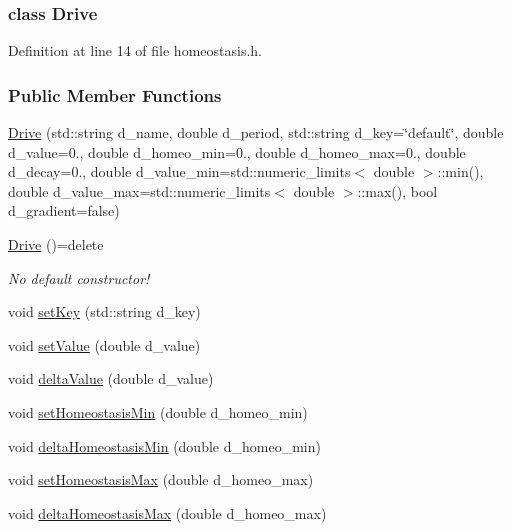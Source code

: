 \subsubsection{class Drive}


Definition at line 14 of file homeostasis.\+h.

\subsubsection*{Public Member Functions}
\begin{DoxyCompactItemize}
\item 
\hyperlink{group__homeostasis_ab98d3c78f3e55b972f730e42dd46de31}{Drive} (std\+::string d\+\_\+name, double d\+\_\+period, std\+::string d\+\_\+key=\char`\"{}default\char`\"{}, double d\+\_\+value=0., double d\+\_\+homeo\+\_\+min=0., double d\+\_\+homeo\+\_\+max=0., double d\+\_\+decay=0., double d\+\_\+value\+\_\+min=std\+::numeric\+\_\+limits$<$ double $>$\+::min(), double d\+\_\+value\+\_\+max=std\+::numeric\+\_\+limits$<$ double $>$\+::max(), bool d\+\_\+gradient=false)
\item 
\hyperlink{group__homeostasis_a289d5dd9c0008856918199c15c520b55}{Drive} ()=delete
\begin{DoxyCompactList}\small\item\em No default constructor! \end{DoxyCompactList}\item 
void \hyperlink{group__homeostasis_aa66a1525b86bf51c0d8d30172766a98b}{set\+Key} (std\+::string d\+\_\+key)
\item 
void \hyperlink{group__homeostasis_a6c5b108ec53e5378f61a0af7ae207dfc}{set\+Value} (double d\+\_\+value)
\item 
void \hyperlink{group__homeostasis_a2f4190860384dcba745f87af3951dd60}{delta\+Value} (double d\+\_\+value)
\item 
void \hyperlink{group__homeostasis_acc9e502d6f8b11e9d66355fb16effdbd}{set\+Homeostasis\+Min} (double d\+\_\+homeo\+\_\+min)
\item 
void \hyperlink{group__homeostasis_a8e2c37a5788ce4ad36c7158dc4a38d12}{delta\+Homeostasis\+Min} (double d\+\_\+homeo\+\_\+min)
\item 
void \hyperlink{group__homeostasis_a54a7b939ea363a8c1bd4433929921f28}{set\+Homeostasis\+Max} (double d\+\_\+homeo\+\_\+max)
\item 
void \hyperlink{group__homeostasis_a56fcf4300b64315033b5b2224235d3e3}{delta\+Homeostasis\+Max} (double d\+\_\+homeo\+\_\+max)

\end{DoxyCompactItemize}
